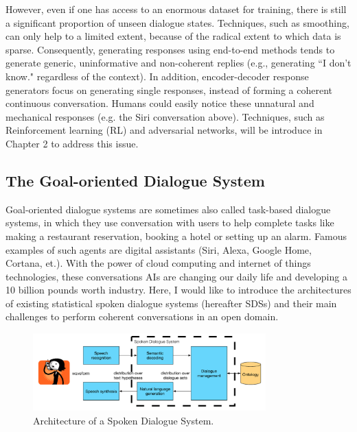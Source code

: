\documentclass[bsc,frontabs,twoside,singlespacing,parskip,deptreport]{infthesis}     %
\begin{document}
However, even if one has access to an enormous dataset for training, there is still a significant proportion of unseen dialogue states. Techniques, such as smoothing, can only help to a limited extent, because of the radical extent to which data is sparse. Consequently, generating responses using end-to-end methods tends to generate generic, uninformative and non-coherent replies (e.g., generating ``I don’t know." regardless of the context). In addition, encoder-decoder response generators focus on generating single responses, instead of forming a coherent continuous conversation\cite{jurafsky2019speech}. Humans could easily notice these unnatural and mechanical responses (e.g. the Siri conversation above). Techniques, such as Reinforcement learning (RL) and adversarial networks, will be introduce in Chapter 2 to address this issue\cite{li2017adversarial,li2016deep}.

\subsection{The Goal-oriented Dialogue System}

 Goal-oriented dialogue systems are sometimes also called task-based dialogue systems, in which they use conversation with users to help complete tasks like making a restaurant reservation, booking a hotel or setting up an alarm. Famous examples of such agents are digital assistants (Siri, Alexa, Google Home, Cortana, et.). With the power of cloud computing and internet of things technologies, these conversations AIs are changing our daily life and developing a 10 billion pounds worth industry. Here, I would like to introduce the architectures of existing statistical spoken dialogue systems (hereafter SDSs) and their main challenges to perform coherent conversations in an open domain. 

\begin{figure}[h]
    \centering
    \includegraphics[width=0.80\textwidth]{sds.png}
    \caption{Architecture of a Spoken Dialogue System.\cite{gasic}}
    \label{fig:sds}
\end{figure}
\end{document}
